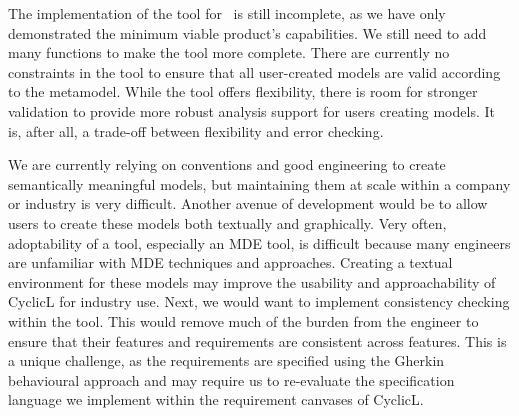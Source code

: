 
The implementation of the tool for \tool\ is still incomplete, as we have only demonstrated the minimum viable product's capabilities. We still need to add many functions to make the tool more complete. There are currently no constraints in the tool to ensure that all user-created models are valid according to the metamodel. While the tool offers flexibility, there is room for stronger validation to provide more robust analysis support for users creating models. It is, after all, a trade-off between flexibility and error checking.

We are currently relying on conventions and good engineering to create semantically meaningful models, but maintaining them at scale within a company or industry is very difficult. Another avenue of development would be to allow users to create these models both textually and graphically. Very often, adoptability of a tool, especially an \gls{MDE} tool, is difficult because many engineers are unfamiliar with \gls{MDE} techniques and approaches. Creating a textual environment for these models may improve the usability and approachability of CyclicL for industry use. Next, we would want to implement consistency checking within the tool. This would remove much of the burden from the engineer to ensure that their features and requirements are consistent across features. This is a unique challenge, as the requirements are specified using the Gherkin behavioural approach and may require us to re-evaluate the specification language we implement within the requirement canvases of CyclicL.

